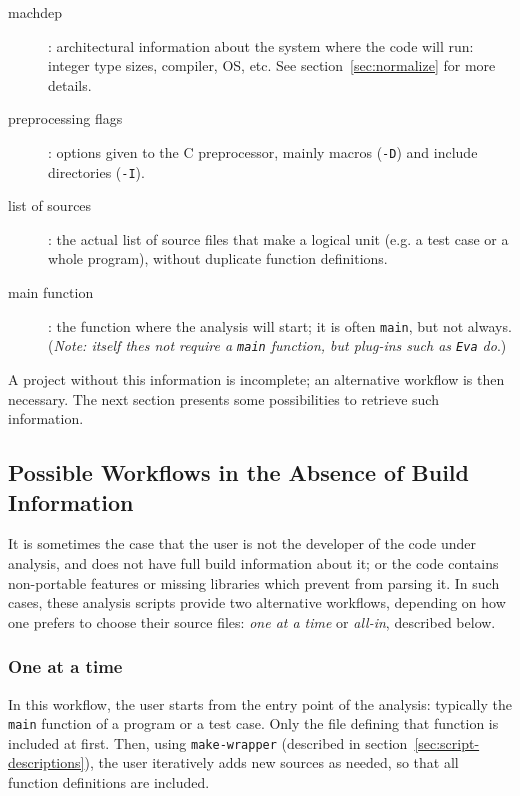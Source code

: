 \begin{description}
\item[machdep]: architectural information about the system where the code will
  run: integer type sizes, compiler, OS, etc.
  See section~\ref{sec:normalize} for more details.
\item[preprocessing flags]: options given to the C preprocessor, mainly
  macros (\texttt{-D}) and include directories (\texttt{-I}).
\item[list of sources]: the actual list of source files that make a logical
  unit (e.g. a test case or a whole program), without duplicate function
  definitions.
\item[main function]: the function where the analysis will start; it is often
  \texttt{main}, but not always. ({\em Note: \FramaC itself thes not require
    a \texttt{main} function, but plug-ins such as \texttt{Eva} do}.)
\end{description}

A project without this information is incomplete; an alternative
workflow is then necessary. The next section presents some possibilities to
retrieve such information.

\subsection{Possible Workflows in the Absence of Build Information}
\label{alternative-workflows}

It is sometimes the case that the \FramaC user is not the developer of the
code under analysis, and does not have full build information about it;
or the code contains non-portable features or missing libraries which prevent
\FramaC from parsing it.
In such cases, these analysis scripts provide two alternative workflows,
depending on how one prefers to choose their source files:
{\em one at a time} or {\em all-in}, described below.

\subsubsection{One at a time}

In this workflow, the user starts from the entry point
of the analysis: typically the \texttt{main} function of a program or a test
case. Only the file defining that function is included at first. Then, using
\texttt{make-wrapper} (described in section~\ref{sec:script-descriptions}),
the user iteratively adds new sources as needed,
so that all function definitions are included.

